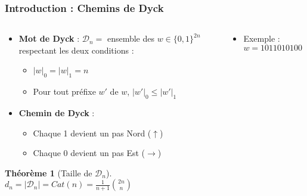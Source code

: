 \documentclass{beamer}
\newtheorem*{thm}{Théorème}
\begin{document}
\begin{frame} %
    \frametitle{Introduction : Chemins de Dyck}
    \begin{columns}
        \begin{column}{0.6\textwidth}
            \begin{itemize}
                \item \textbf{Mot de Dyck} : $\mathcal{D}_n =$ ensemble
                des $w \in \{0,1\}^{2n}$ respectant les deux conditions :
                \begin{itemize}
                    \item $|w|_0 = |w|_1 = n$
                    \item Pour tout préfixe $w'$ de $w$, $|w'|_0 \leqslant
                        |w'|_1$
                \end{itemize}
                \item \textbf{Chemin de Dyck} :
                \begin{itemize}
                    \item Chaque 1 devient un pas Nord ($\uparrow$)
                    \item Chaque 0 devient un pas Est ($\rightarrow$)
                \end{itemize}
            \end{itemize}

            \begin{thm}[Taille de $\mathcal{D}_n$]
                $\displaystyle d_n = |\mathcal{D}_n| = Cat(n) =
                    \frac{1}{n+1}\binom{2n}{n}$
            \end{thm}

        \end{column}
        \begin{column}{0.4\textwidth}
            \begin{itemize}
                \item Exemple : $w = 1011010100$
            \end{itemize}
            
        \end{column}
    \end{columns}
\end{frame}
\end{document}
